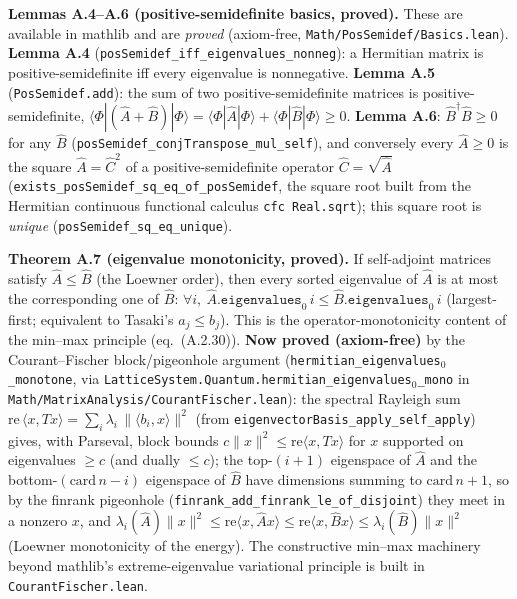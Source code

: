 \documentclass[a4paper,11pt]{article}
\begin{document}
\medskip\noindent\textbf{Lemmas A.4--A.6 (positive-semidefinite basics, proved).}  These are
available in mathlib and are \emph{proved} (axiom-free,
\texttt{Math/PosSemidef/Basics.lean}).  \textbf{Lemma A.4}
(\texttt{posSemidef\_iff\_eigenvalues\_nonneg}): a Hermitian matrix is positive-semidefinite
iff every eigenvalue is nonnegative.  \textbf{Lemma A.5} (\texttt{PosSemidef.add}): the sum of
two positive-semidefinite matrices is positive-semidefinite,
$\langle\Phi|(\hat A+\hat B)|\Phi\rangle=\langle\Phi|\hat A|\Phi\rangle+\langle\Phi|\hat B|\Phi\rangle\ge0$.
\textbf{Lemma A.6}: $\hat B^\dagger\hat B\ge0$ for any $\hat B$
(\texttt{posSemidef\_conjTranspose\_mul\_self}), and conversely every $\hat A\ge0$ is the square
$\hat A=\hat C^2$ of a positive-semidefinite operator $\hat C=\sqrt{\hat A}$
(\texttt{exists\_posSemidef\_sq\_eq\_of\_posSemidef}, the square root built from the Hermitian
continuous functional calculus \texttt{cfc Real.sqrt}); this square root is \emph{unique}
(\texttt{posSemidef\_sq\_eq\_unique}).

\medskip\noindent\textbf{Theorem A.7 (eigenvalue monotonicity, proved).}  If self-adjoint
matrices satisfy $\hat A\le\hat B$ (the Loewner order), then every sorted eigenvalue of $\hat A$
is at most the corresponding one of $\hat B$: $\forall i,\ \hat A.\texttt{eigenvalues}_0\,i\le\hat
B.\texttt{eigenvalues}_0\,i$ (largest-first; equivalent to Tasaki's $a_j\le b_j$).  This is the
operator-monotonicity content of the min--max principle (eq.~(A.2.30)).  \textbf{Now proved
(axiom-free)} by the Courant--Fischer block/pigeonhole argument
(\texttt{hermitian\_eigenvalues}$_0$\texttt{\_monotone}, via
\texttt{LatticeSystem.Quantum.hermitian\_eigenvalues}$_0$\texttt{\_mono} in
\texttt{Math/MatrixAnalysis/CourantFischer.lean}): the spectral Rayleigh sum $\mathrm{re}\,\langle
x,Tx\rangle=\sum_i\lambda_i\,\lVert\langle b_i,x\rangle\rVert^2$ (from
\texttt{eigenvectorBasis\_apply\_self\_apply}) gives, with Parseval, block bounds
$c\lVert x\rVert^2\le\mathrm{re}\langle x,Tx\rangle$ for $x$ supported on eigenvalues $\ge c$ (and
dually $\le c$); the top-$(i{+}1)$ eigenspace of $\hat A$ and the bottom-$(\mathrm{card}\,n-i)$
eigenspace of $\hat B$ have dimensions summing to $\mathrm{card}\,n+1$, so by the finrank pigeonhole
(\texttt{finrank\_add\_finrank\_le\_of\_disjoint}) they meet in a nonzero $x$, and
$\lambda_i(\hat A)\lVert x\rVert^2\le\mathrm{re}\langle x,\hat Ax\rangle\le\mathrm{re}\langle x,\hat
Bx\rangle\le\lambda_i(\hat B)\lVert x\rVert^2$ (Loewner monotonicity of the energy).  The
constructive min--max machinery beyond mathlib's extreme-eigenvalue variational principle is built
in \texttt{CourantFischer.lean}.
\end{document}
